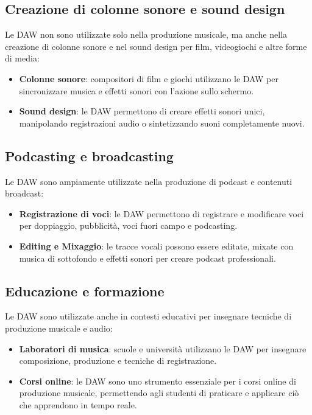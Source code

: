 \documentclass{book}
\begin{document}
\subsection{Creazione di colonne sonore e sound design}

Le DAW non sono utilizzate solo nella produzione musicale, ma anche nella creazione di colonne sonore e nel sound design per film, videogiochi e altre forme di media:

\begin{itemize}
\item \textbf{Colonne sonore}: compositori di film e giochi utilizzano le DAW per sincronizzare musica e effetti sonori con l’azione sullo schermo.
\item \textbf{Sound design}: le DAW permettono di creare effetti sonori unici, manipolando registrazioni audio o sintetizzando suoni completamente nuovi.
\end{itemize}

\subsection{Podcasting e broadcasting}

Le DAW sono ampiamente utilizzate nella produzione di podcast e contenuti broadcast:

\begin{itemize}
\item \textbf{Registrazione di voci}: le DAW permettono di registrare e modificare voci per doppiaggio, pubblicità, voci fuori campo e podcasting.
\item \textbf{Editing e Mixaggio}: le tracce vocali possono essere editate, mixate con musica di sottofondo e effetti sonori per creare podcast professionali.
\end{itemize}

\subsection{Educazione e formazione}

Le DAW sono utilizzate anche in contesti educativi per insegnare tecniche di produzione musicale e audio:

\begin{itemize}
\item \textbf{Laboratori di musica}: scuole e università utilizzano le DAW per insegnare composizione, produzione e tecniche di registrazione.
\item \textbf{Corsi online}: le DAW sono uno strumento essenziale per i corsi online di produzione musicale, permettendo agli studenti di praticare e applicare ciò che apprendono in tempo reale.
\end{itemize}
\end{document}
